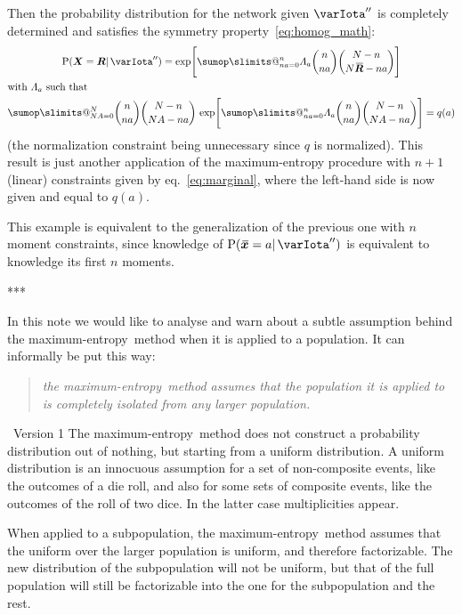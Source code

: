 \documentclass{article}
\makeatletter
\theoremstyle{remark}
\theoremstyle{innote}
\def\sum{\DOTSI\sumop\slimits@}
\renewcommand*{\|}{\mathpunct{|}}%
\newcommand*{\p}{\mathrm{P}}%
\newcommand*{\eqn}{eq.}%
\theoremstyle{simple}
\newcommand*{\puzzle}{{\fontencoding{U}\fontfamily{fontawesometwo}\selectfont\symbol{225}}}
\newcommand*{\mynote}[1]{ {\color{notecolour}\puzzle\ #1}}
\newcommand*{\widebar}[1]{{\mkern1.5mu\skew{2}\overline{\mkern-1.5mu#1\mkern-1.5mu}\mkern 1.5mu}}
\newcommand*{\av}{\widebar} %
\newcommand*{\sav}{\widebar} %
\newcommand*{\yxx}{x}%
\newcommand*{\yx}{\bm{\yxx}}%
\newcommand*{\yxs}{\sav{\yx}}%
\newcommand*{\yX}{\bm{X}}%
\newcommand*{\yXf}{\av{\yX}}%
\newcommand*{\yR}{\bm{R}}%
\newcommand*{\yRf}{\av{\yR}}%
\newcommand*{\yHb}{\varIota''}
\newcommand*{\yL}{\varLambda}
\newcommand*{\me}{maximum-entropy}
\makeatother
\begin{document}
\medskip Then the probability distribution for the network given $\yHb$ is
completely determined and satisfies the symmetry
property~\eqref{eq:homog_math}:
\begin{multline}
  \label{eq:pop_distr_maxent2}
  \p(\yX= \yR \|\yHb) =
\exp\Biggl[
\sum_{n a=0}^n \yL_{ a}
\binom{n}{n a}
\binom{N-n}{N\yRf-n a}\Biggr]
\\
\!\begin{aligned}[b]
&\text{with $\yL_{ a}$ such that}
\\
&\sum_{N A=0}^N 
\binom{n}{n a}
\binom{N-n}{N A-n a}\,
\exp\Biggl[
\sum_{n a=0}^n \yL_{ a}
\binom{n}{n a}
\binom{N-n}{N A-n a}\Biggr]
=q( a)
\end{aligned}
\end{multline}
(the normalization constraint being unnecessary since $q$ is normalized).
This result is just another application of the maximum-entropy procedure
with $n+1$ (linear) constraints given by \eqn~\eqref{eq:marginal}, where
the left-hand side is now given and equal to $q(a)$.

This example is equivalent to the generalization of the previous one with
$n$ moment constraints, since knowledge of $\p(\yxs=a \| \yHb)$ is
equivalent to knowledge its first $n$ moments.

***



In this note we would like to analyse and warn about a subtle assumption
behind the \me\ method when it is applied to a population. It can informally
be put this way:
\begin{quote}
  \emph{the \me\ method assumes that the population it is applied to is
    completely isolated from any larger population.}
\end{quote}

\mynote{Version 1}
The \me\ method does not construct a probability distribution out of
nothing, but starting from a uniform distribution. A uniform distribution
is an innocuous assumption for a set of non-composite events, like the
outcomes of a die roll, and also for some sets of composite events, like
the outcomes of the roll of two dice. In the latter case multiplicities
appear.

When applied to a subpopulation, the \me\ method assumes that the uniform over
the larger population is uniform, and therefore factorizable. The new
distribution of the subpopulation will not be uniform, but that of the full
population will still be factorizable into the one for the subpopulation and the
rest.
\end{document}

